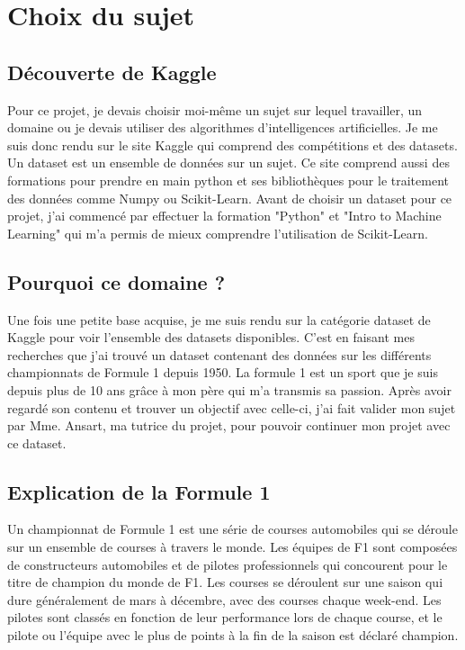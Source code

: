 \chapter{Choix du sujet}

\section{Découverte de Kaggle}
Pour ce projet, je devais choisir moi-même un sujet sur lequel travailler, un domaine ou je devais utiliser des algorithmes d'intelligences artificielles. Je me suis donc rendu sur le site Kaggle qui comprend des compétitions et des datasets. Un dataset est un ensemble de données sur un sujet. Ce site comprend aussi des formations pour prendre en main python et ses bibliothèques pour le traitement des données comme Numpy ou Scikit-Learn. Avant de choisir un dataset pour ce projet, j'ai commencé par effectuer la formation "Python" et "Intro to Machine Learning" qui m'a permis de mieux comprendre l'utilisation de Scikit-Learn.

\section{Pourquoi ce domaine ?}
Une fois une petite base acquise, je me suis rendu sur la catégorie dataset de Kaggle pour voir l'ensemble des datasets disponibles. C'est en faisant mes recherches que j'ai trouvé un dataset contenant des données sur les différents championnats de Formule 1 depuis 1950. La formule 1 est un sport que je suis depuis plus de 10 ans grâce à mon père qui m'a transmis sa passion. Après avoir regardé son contenu et trouver un objectif avec celle-ci, j'ai fait valider mon sujet par Mme. Ansart, ma tutrice du projet, pour pouvoir continuer mon projet avec ce dataset.

\section{Explication de la Formule 1}
Un championnat de Formule 1 est une série de courses automobiles qui se déroule sur un ensemble de courses à travers le monde. Les équipes de F1 sont composées de constructeurs automobiles et de pilotes professionnels qui concourent pour le titre de champion du monde de F1. Les courses se déroulent sur une saison qui dure généralement de mars à décembre, avec des courses chaque week-end. Les pilotes sont classés en fonction de leur performance lors de chaque course, et le pilote ou l'équipe avec le plus de points à la fin de la saison est déclaré champion.\\

